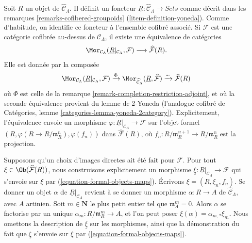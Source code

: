 \begin{remark}
\label{remark-formal-objects-yoneda}
Soit $R$ un objet de $\widehat{\mathcal{C}}_\Lambda$. Il définit un foncteur
$\underline{R}: \widehat{\mathcal{C}}_\Lambda \to \textit{Sets}$
comme décrit dans les remarques \ref{remarks-cofibered-groupoids}
(\ref{item-definition-yoneda}). Comme d'habitude, on identifie ce foncteur à
l'ensemble cofibré associé. Si $\mathcal{F}$ est une catégorie cofibrée
au-dessus de $\mathcal{C}_\Lambda$, il existe une équivalence de catégories
\begin{equation}
\label{equation-formal-objects-maps}
\Mor_{\mathcal{C}_\Lambda}(
\underline{R}|_{\mathcal{C}_\Lambda}, \mathcal{F})
\longrightarrow
\widehat{\mathcal{F}}(R).
\end{equation}
Elle est donnée par la composée
$$
\Mor_{\mathcal{C}_\Lambda}(
\underline{R}|_{\mathcal{C}_\Lambda}, \mathcal{F})
\xrightarrow{\Phi}
\Mor_{\widehat{\mathcal{C}}_\Lambda}(
\underline{R}, \widehat{\mathcal{F}})
\xrightarrow{\sim}
\widehat{\mathcal{F}}(R)
$$
où $\Phi$ est celle de la remarque
\ref{remark-completion-restriction-adjoint}, et où la seconde équivalence
provient du lemme de 2-Yoneda (l'analogue cofibré de Catégories, lemme
\ref{categories-lemma-yoneda-2category}). Explicitement, l'équivalence envoie
un morphisme
$\varphi : \underline{R}|_{\mathcal{C}_\Lambda} \to \mathcal{F}$
sur l'objet formel
$(R, \varphi(R \to R/\mathfrak{m}_R^n), \varphi(f_n))$ dans
$\widehat{\mathcal{F}}(R)$, où
$f_n : R/\mathfrak m_R^{n + 1} \to R/\mathfrak m_R^n$ est la projection.

\medskip\noindent
Supposons qu'un choix d'images directes ait été fait pour $\mathcal{F}$.
Pour tout $\xi \in \Ob(\widehat{\mathcal{F}}(R))$, nous construisons
explicitement un morphisme
$\underline{\xi} : \underline{R}|_{\mathcal{C}_\Lambda} \to \mathcal{F}$
qui s'envoie sur $\xi$ par (\ref{equation-formal-objects-maps}). Écrivons
$\xi = (R, \xi_n, f_n)$. Se donner un objet $\alpha$ de
$\underline{R}|_{\mathcal{C}_\Lambda}$ revient à se donner un morphisme
$\alpha : R \to A$ de $\widehat{\mathcal{C}}_\Lambda$, avec $A$ artinien.
Soit $m \in \mathbf{N}$ le plus petit entier tel que
$\mathfrak m_A^m = 0$. Alors $\alpha$ se factorise par un unique
$\alpha_m : R/\mathfrak m_R^m \to A$, et l'on peut poser
$\underline{\xi}(\alpha) = \alpha_{m, *}\xi_m$. Nous omettons la description
de $\underline{\xi}$ sur les morphismes, ainsi que la démonstration du fait
que $\underline{\xi}$ s'envoie sur $\xi$ par
(\ref{equation-formal-objects-maps}).


\end{remark}
